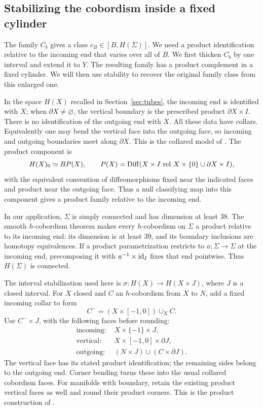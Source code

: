 \subsection{Stabilizing the cobordism inside a fixed cylinder}

The family $C_b$ gives a class $c_B\in[B,H(\Sigma)]$. We need a
product identification relative to the incoming end that varies over all
of $B$. We first thicken $C_b$ by one interval and
extend it to $Y$. The resulting family has a product complement in a
fixed cylinder. We will then use stability to recover the original
family class from this enlarged one.

In the space $H(X)$ recalled in Section~\ref{sec:tubes}, the incoming end is identified with $X$; when
$\partial X\ne\varnothing$, the vertical boundary is the prescribed
product $\partial X\times I$. There is no identification of the outgoing
end with $X$. All these data have collars. Equivalently one may bend the
vertical face into the outgoing face, so incoming and outgoing boundaries
meet along $\partial X$. This is the collared model of
\cite[Definitions~1.1.1 and~1.1.3]{WJR2013}. The product component is
\[
 H(X)_0\simeq BP(X),\qquad
 P(X)=\operatorname{Diff}(X\times I\ \mathrm{rel}\
 X\times\{0\}\cup\partial X\times I),
\]
with the equivalent convention of diffeomorphisms fixed near the indicated
faces and product near the outgoing face. Thus a null classifying map
into this component gives a product family relative to the incoming end.

In our application, $\Sigma$ is simply connected and has dimension at least $38$.
The smooth $h$-cobordism theorem
\cite[Theorem~9.1]{Milnor1965} makes every $h$-cobordism on $\Sigma$ a
product relative to its incoming end: its dimension is at least $39$,
and its boundary inclusions are homotopy equivalences. If a product
parametrization restricts to $a:\Sigma\to\Sigma$ at the incoming end,
precomposing it with $a^{-1}\times\operatorname{id}_I$ fixes that end pointwise.
Thus $H(\Sigma)$ is connected.

The interval stabilization used here is
$\sigma:H(X)\to H(X\times J)$, where $J$ is a closed interval. For $X$
closed and $C$ an $h$-cobordism from $X$ to $N$, add a fixed incoming
collar to form
\[
 C^-=(X\times[-1,0])\cup_X C.
\]
Use $C^-\times J$, with the following faces before rounding:
\begin{equation}\label{eq:stabilization-faces}
 \begin{aligned}
 \text{incoming: }&X\times\{-1\}\times J,\\
 \text{vertical: }&X\times[-1,0]\times\partial J,\\
 \text{outgoing: }&(N\times J)\cup(C\times\partial J).
 \end{aligned}
\end{equation}
The vertical face has its stated product identification; the remaining
sides belong to the outgoing end. Corner bending turns these into the
usual collared cobordism faces. For manifolds with boundary, retain the
existing product vertical faces as well and round their product corners.
This is the product construction of \cite[Definition~1.1.3]{WJR2013}.

